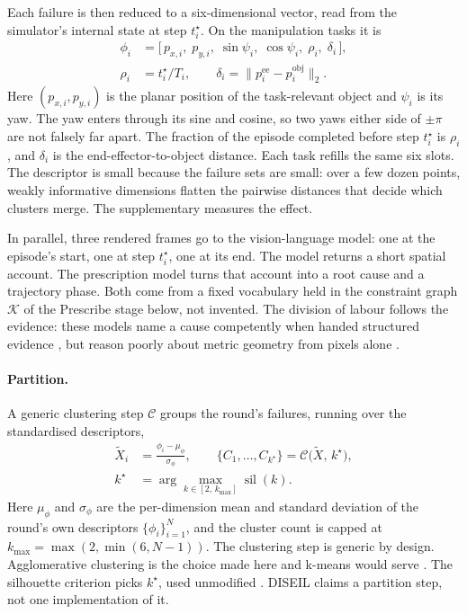 Each failure is then reduced to a six-dimensional vector, read from the
simulator's internal state at step $t^\star_i$. On the manipulation tasks it is
%
\begin{equation}
\label{eq:desc}
\begin{aligned}
\phi_i &= \big[\, p_{x,i},\; p_{y,i},\; \sin\psi_i,\; \cos\psi_i,\; \rho_i,\;
\delta_i \,\big],\\
\rho_i &= t^\star_i / T_i, \qquad
\delta_i = \big\| p^{\mathrm{ee}}_i - p^{\mathrm{obj}}_i \big\|_2.
\end{aligned}
\end{equation}
%
Here $(p_{x,i}, p_{y,i})$ is the planar position of the task-relevant object and
$\psi_i$ is its yaw. The yaw enters through its sine and cosine, so two yaws
either side of $\pm\pi$ are not falsely far apart. The fraction of the episode
completed before step $t^\star_i$ is $\rho_i$, and $\delta_i$ is the
end-effector-to-object distance. Each task refills the same six slots. The
descriptor is small because the failure sets are small: over a few dozen points,
weakly informative dimensions flatten the pairwise distances that decide which
clusters merge. The supplementary measures the effect.

In parallel, three rendered frames go to the vision-language model: one at the
episode's start, one at step $t^\star_i$, one at its end. The model returns a short
spatial account. The prescription model turns that account into a root cause and a
trajectory phase. Both come from a fixed vocabulary held in the constraint graph
$\mathcal{K}$ of the Prescribe stage below, not invented. The division of labour
follows the evidence: these models name a cause competently when handed structured
evidence \cite{duan2025aha,liu2023reflect}, but reason poorly about metric geometry
from pixels alone \cite{chen2024spatialvlm,fu2024blink}.

\paragraph{Partition.} A generic clustering step $\mathcal{C}$ groups the round's
failures, running over the standardised descriptors,
%
\begin{equation}
\label{eq:kstar}
\begin{aligned}
\tilde{X}_i &= \frac{\phi_i - \mu_\phi}{\sigma_\phi}, \qquad
\{C_1,\dots,C_{k^\star}\} = \mathcal{C}\big(\tilde{X},\, k^\star\big),\\
k^\star &= \arg\max_{k \in [2,\,k_{\max}]} \operatorname{sil}(k).
\end{aligned}
\end{equation}
%
Here $\mu_\phi$ and $\sigma_\phi$ are the per-dimension mean and standard deviation
of the round's own descriptors $\{\phi_i\}_{i=1}^{N}$, and the cluster count is
capped at $k_{\max} = \max(2, \min(6, N-1))$. The clustering step is generic by
design.
Agglomerative clustering is the choice made here \cite{ward1963hierarchical} and
k-means would serve \cite{lloyd1982kmeans}. The silhouette criterion picks
$k^\star$, used unmodified \cite{rousseeuw1987silhouette,pedregosa2011sklearn}.
DISEIL claims a partition step, not one implementation of it.


